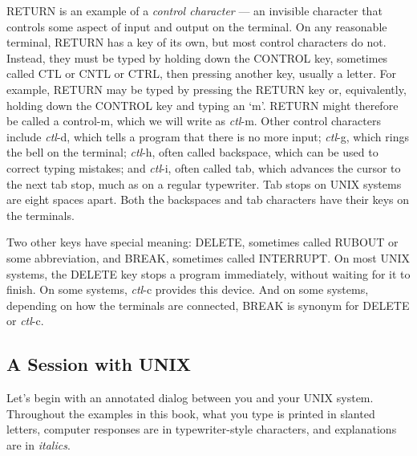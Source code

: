RETURN is an example of a \textit{control character} --- an invisible character
that controls some aspect of input and output on the terminal. On any reasonable
terminal, RETURN has a key of its own, but most control characters do
not. Instead, they must be typed by holding down the CONTROL key, sometimes
called CTL or CNTL or CTRL, then pressing another key, usually a letter. For
example, RETURN may be typed by pressing the RETURN key or, equivalently,
holding down the CONTROL key and typing an `m'. RETURN might therefore be called
a control-m, which we will write as \textit{ctl}-m. Other control characters
include \textit{ctl}-d, which tells a program that there is no more input;
\textit{ctl}-g, which rings the bell on the terminal; \textit{ctl}-h, often
called backspace, which can be used to correct typing mistakes; and
\textit{ctl}-i, often called tab, which advances the cursor to the next tab
stop, much as on a regular typewriter. Tab stops on UNIX systems are eight
spaces apart. Both the backspaces and tab characters have their keys on the
terminals.

Two other keys have special meaning: DELETE, sometimes called RUBOUT or some
abbreviation, and BREAK, sometimes called INTERRUPT. On most UNIX systems, the
DELETE key stops a program immediately, without waiting for it to finish. On
some systems, \textit{ctl}-c provides this device. And on some systems,
depending on how the terminals are connected, BREAK is synonym for DELETE or
\textit{ctl}-c.


\subsection{A Session with UNIX}

Let's begin with an annotated dialog between you and your UNIX system.
Throughout the examples in this book, what you type is printed in slanted
letters, computer responses are in typewriter-style characters, and explanations
are in \textit{italics}.

